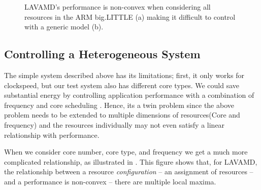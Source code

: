 \begin{figure}
  \subfloat[]
  {
    
    \label{fig:lavamd_control2}
  }
  \caption{LAVAMD's performance is non-convex when considering all
    resources in the ARM big.LITTLE (a) making it difficult to control
    with a generic model (b).}
 \label{fig:learning-models}
\end{figure}


\subsection{Controlling a Heterogeneous System}
The simple system described above has its limitations;  first,
it only works for clockspeed, but our test system also has different
core types.  We could save substantial energy by controlling
application performance with a combination of frequency and core
scheduling \cite{Carroll,Imes}.  Hence, its a twin problem since the above problem needs to be extended to multiple dimensions of resources(Core and frequency) and the resources individually may not even satisfy a linear relationship with performance. 

When we consider core number, core type, and frequency we get a much
more complicated relationship, as illustrated in
.  This figure shows that, for LAVAMD, the
relationship between a resource \emph{configuration} -- \ie{} an
assignment of resources -- and a performance is non-convex -- \ie{} there are multiple local maxima.  



